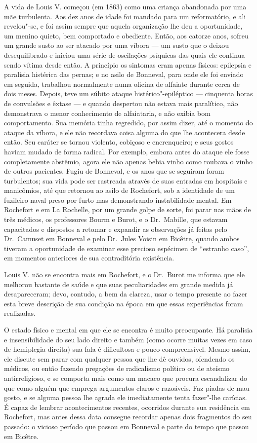 A vida de Louis V. começou (em 1863) como uma criança abandonada por uma
mãe turbulenta.  Aos dez anos de idade foi mandado para um
reformatório, e ali revelou"-se, e foi assim sempre que aquela
organização lhe deu a oportunidade, um menino quieto, bem comportado e
obediente.  Então, aos catorze anos, sofreu um grande susto ao ser
atacado por uma víbora --- um susto que o deixou desequilibrado e iniciou
uma série de oscilações psíquicas das quais ele continua sendo vítima
desde então.  A princípio os sintomas eram apenas físicos: epilepsia e
paralisia histérica das pernas; e no asilo de Bonneval, para onde ele
foi enviado em seguida, trabalhou normalmente numa oficina de alfaiate
durante cerca de dois meses.  Depois, teve um súbito ataque
histérico"-epiléptico --- cinquenta horas de convulsões e êxtase --- e
quando despertou não estava mais paralítico, não demonstrava o menor
conhecimento de alfaiataria, e não exibia bom comportamento.  Sua
memória tinha regredido, por assim dizer, até o momento do ataque da
víbora, e ele não recordava coisa alguma do que lhe acontecera desde
então.  Seu caráter se tornou violento, cobiçoso e encrenqueiro; e
seus gostos haviam mudado de forma radical.  Por exemplo, embora antes
do ataque ele fosse completamente abstêmio, agora ele não apenas bebia
vinho como roubava o vinho de outros pacientes.  Fugiu de Bonneval, e
os anos que se seguiram foram turbulentos; sua vida pode ser rastreada
através de suas entradas em hospitais e manicômios, até que retornou
ao asilo de Rochefort, sob a identidade de um fuzileiro naval preso por
furto mas demonstrando instabilidade mental. Em Rochefort e em La
Rochelle, por um grande golpe de sorte, foi parar nas mãos de três
médicos, os professores Bourm e Burot, e o Dr.~Mabille, que estavam
capacitados e dispostos a retomar e expandir as observações já feitas
pelo Dr.~Camuset em Bonneval e pelo Dr.~Jules Voisin em Bicêtre, quando
ambos tiveram a oportunidade de examinar esse precioso espécimen de
“estranho caso”, em momentos anteriores de sua contraditória
existência.

Louis V. não se encontra mais em Rochefort, e o Dr.~Burot me informa que
ele melhorou bastante de saúde e que suas peculiaridades em grande
medida já desapareceram; devo, contudo, a bem da clareza, usar o tempo
presente ao fazer esta breve descrição de sua condição na época em que
essas experiências foram realizadas.

O estado físico e mental em que ele se encontra é muito preocupante. Há
paralisia e insensibilidade do seu lado direito e também (como ocorre
muitas vezes em caso de hemiplegia direita) sua fala é dificultosa e
pouco compreensível.  Mesmo assim, ele discute sem parar com qualquer
pessoa que lhe dê ouvidos, ofendendo os médicos, ou então fazendo
pregações de radicalismo político ou de ateísmo antirreligioso, e se
comporta mais como um macaco que procura escandalizar do que como
alguém que emprega argumentos claros e razoáveis. Faz piadas de mau
gosto, e se alguma pessoa lhe agrada ele imediatamente tenta fazer"-lhe
carícias.  É capaz de lembrar acontecimentos recentes, ocorridos
durante sua residência em Rochefort, mas antes dessa data consegue
recordar apenas dois fragmentos do seu passado: o vicioso período que
passou em Bonneval e parte do tempo que passou em Bicêtre.

